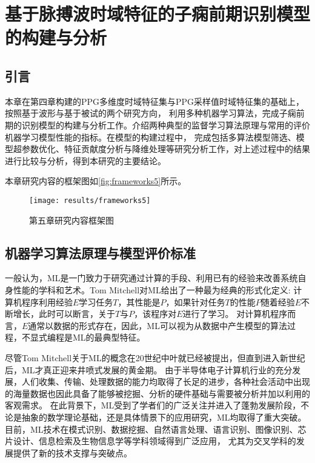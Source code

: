 \chapter{基于脉搏波时域特征的子痫前期识别模型的构建与分析}
\section{引言}
本章在第四章构建的PPG多维度时域特征集与PPG采样值时域特征集的基础上，按照基于波形与基于被试的两个研究方向，
利用多种机器学习算法，完成子痫前期的识别模型的构建与分析工作。介绍两种典型的监督学习算法原理与常用的评价机器学习模型性能的指标。在模型的构建过程中，
完成包括多算法模型筛选、模型超参数优化、特征贡献度分析与降维处理等研究分析工作，对上述过程中的结果进行比较与分析，得到本研究的主要结论。

本章研究内容的框架图如\autoref{fig:frameworks5}所示。

\begin{figure}[htbp]
    \centering
    \texttt{[image: results/frameworks5]}
    \caption{\label{fig:frameworks5}第五章研究内容框架图}
\end{figure}
\vspace{-0.8cm} 

\section{机器学习算法原理与模型评价标准}
一般认为，ML是一门致力于研究通过计算的手段、利用已有的经验来改善系统自身性能的学科和艺术\cite{Zhou2016,Aurélien2018}。Tom Mitchell对ML给出了一种最为经典的形式化定义:
计算机程序利用经验$E$学习任务$T$，其性能是$P$，如果针对任务$T$的性能$P$随着经验$E$不断增长，此时可以断言，关于$T$与$P$，该程序对$E$进行了学习\cite{mitchell1997,Zhou2016}。
对计算机程序而言，$E$通常以数据的形式存在，因此，ML可以视为从数据中产生模型的算法过程，不显式编程是ML的最典型特征。

尽管Tom Mitchell关于ML的概念在20世纪中叶就已经被提出，但直到进入新世纪后，ML才真正迎来井喷式发展的黄金期。
由于半导体电子计算机行业的充分发展，人们收集、传输、处理数据的能力均取得了长足的进步，各种社会活动中出现的海量数据也因此具备了能够被挖掘、分析的硬件基础与需要被分析并加以利用的客观需求。
在此背景下，ML受到了学者们的广泛关注并进入了蓬勃发展阶段，不论是抽象的数学理论基础，还是具体情景下的应用研究，ML均取得了重大突破。
目前，ML技术在模式识别、数据挖掘、自然语言处理、语言识别、图像识别、芯片设计、信息检索及生物信息学等学科领域得到广泛应用，
尤其为交叉学科的发展提供了新的技术支撑与突破点\cite{Zhou2016,Aurélien2018,Li2017}。   

